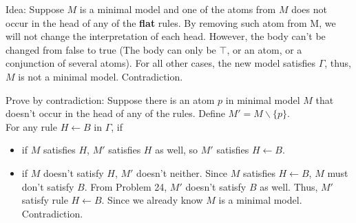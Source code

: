\documentclass[12pt]{article}
\begin{document}
\begin{enumerate}
Idea: Suppose $M$ is a minimal model and one of the atoms from $M$ does not occur in the head of any of the \textbf{flat} rules. By removing such atom from M, we will not change the interpretation of each head. However, the body can't be changed from false to true (The body can only be $\top$, or an atom, or a conjunction of several atoms). For all other cases, the new model satisfies $\Gamma$, thus, $M$ is not a minimal model. Contradiction. 

Prove by contradiction: Suppose there is an atom $p$ in minimal model $M$ that doesn't occur in the head of any of the rules. Define $M' = M \backslash \{p\}$. \\
For any rule $H \leftarrow B$ in $\Gamma$, if 
    \begin{itemize}
        \item if $M$ satisfies $H$, $M'$ satisfies $H$ as well, so $M'$ satisfies $H \leftarrow B$. 
        \item if $M$ doesn't satisfy $H$, $M'$ doesn't neither. Since $M$ satisfies $H \leftarrow B$, $M$ must don't satisfy $B$. From Problem 24, $M'$ doesn't satisfy $B$ as well.  Thus, $M'$ satisfy rule $H \leftarrow B$. Since we already know $M$ is a minimal model. Contradiction. 
    \end{itemize}



\end{enumerate}
\end{document}
